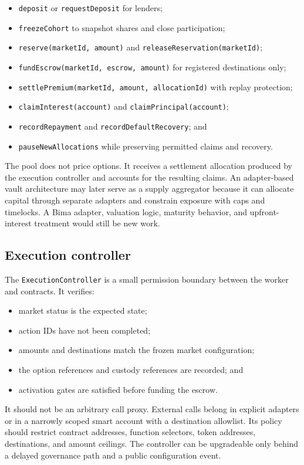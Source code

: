 \documentclass[11pt,oneside]{article}
\begin{document}
\begin{itemize}
\item \texttt{deposit} or \texttt{requestDeposit} for lenders;
\item \texttt{freezeCohort} to snapshot shares and close participation;
\item \texttt{reserve(marketId, amount)} and \texttt{releaseReservation(marketId)};
\item \texttt{fundEscrow(marketId, escrow, amount)} for registered destinations only;
\item \texttt{settlePremium(marketId, amount, allocationId)} with replay protection;
\item \texttt{claimInterest(account)} and \texttt{claimPrincipal(account)};
\item \texttt{recordRepayment} and \texttt{recordDefaultRecovery}; and
\item \texttt{pauseNewAllocations} while preserving permitted claims and recovery.
\end{itemize}

The pool does not price options. It receives a settlement allocation produced by the execution controller and accounts for the resulting claims. An adapter-based vault architecture may later serve as a supply aggregator because it can allocate capital through separate adapters and constrain exposure with caps and timelocks. A Bima adapter, valuation logic, maturity behavior, and upfront-interest treatment would still be new work.

\subsection{Execution controller}

The \texttt{ExecutionController} is a small permission boundary between the worker and contracts. It verifies:

\begin{itemize}
\item market status is the expected state;
\item action IDs have not been completed;
\item amounts and destinations match the frozen market configuration;
\item the option references and custody references are recorded; and
\item activation gates are satisfied before funding the escrow.
\end{itemize}

It should not be an arbitrary call proxy. External calls belong in explicit adapters or in a narrowly scoped smart account with a destination allowlist. Its policy should restrict contract addresses, function selectors, token addresses, destinations, and amount ceilings. The controller can be upgradeable only behind a delayed governance path and a public configuration event.
\end{document}
